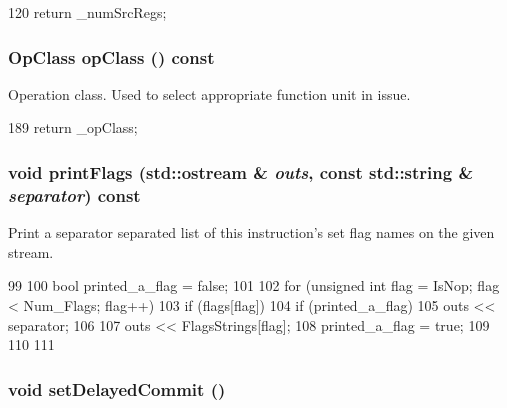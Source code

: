 \begin{DoxyCode}
120 { return _numSrcRegs; }
\end{DoxyCode}
\hypertarget{classStaticInst_aa4919f97cae20d4d82391c1fc6d5fda6}{
\subsubsection[{opClass}]{\setlength{\rightskip}{0pt plus 5cm}OpClass opClass () const}}
\label{classStaticInst_aa4919f97cae20d4d82391c1fc6d5fda6}


Operation class. Used to select appropriate function unit in issue. 


\begin{DoxyCode}
189 { return _opClass; }
\end{DoxyCode}
\hypertarget{classStaticInst_a075612781e45266370c86be07b9086f2}{
\subsubsection[{printFlags}]{\setlength{\rightskip}{0pt plus 5cm}void printFlags (std::ostream \& {\em outs}, \/  const std::string \& {\em separator}) const}}
\label{classStaticInst_a075612781e45266370c86be07b9086f2}
Print a separator separated list of this instruction's set flag names on the given stream. 


\begin{DoxyCode}
99 {
100     bool printed_a_flag = false;
101 
102     for (unsigned int flag = IsNop; flag < Num_Flags; flag++) {
103         if (flags[flag]) {
104             if (printed_a_flag)
105                 outs << separator;
106 
107             outs << FlagsStrings[flag];
108             printed_a_flag = true;
109         }
110     }
111 }
\end{DoxyCode}
\hypertarget{classStaticInst_a962e50e6bada636e2fee41feb5650da8}{
\subsubsection[{setDelayedCommit}]{\setlength{\rightskip}{0pt plus 5cm}void setDelayedCommit ()}}
\label{classStaticInst_a962e50e6bada636e2fee41feb5650da8}



